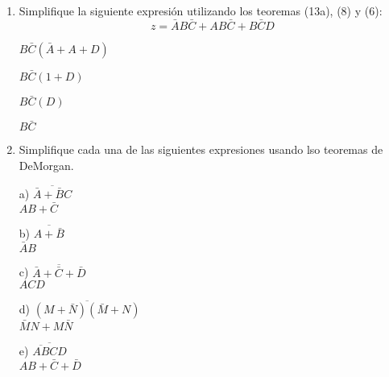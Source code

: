 \documentclass[a4paper, 12pt]{article}
\newcommand{\Aspace}{0.2cm}
\begin{document}
\begin{enumerate}
        
        \item Simplifique la siguiente expresión utilizando los teoremas (13a), (8) y (6):
        \[ z = \bar{A}B\bar{C} + AB\bar{C} + B\bar{C}D \]
            \par
            { \color{azul} 
                        $B\bar{C}(\bar{A} + A + D)$
                \par    $B\bar{C}(1 + D)$
                \par    $B\bar{C}(D)$
                \par    $B\bar{C}$
            }



        \item Simplifique cada una de las siguientes expresiones usando lso teoremas de DeMorgan.
            \vspace{\Aspace} \par
            a) $\overline{\bar{A} + \bar{B}C}$
            \\ { \color{azul} $AB + \bar{C}$ }

            \vspace{\Aspace} \par
            b) $\overline{A + \bar{B}}$
            \\ { \color{azul} $\bar{A}B$ }

            \vspace{\Aspace} \par
            c) $\overline{\bar{A} + \bar{C} + \bar{D}}$
            \\ { \color{azul} $ACD$ }

            \vspace{\Aspace} \par
            d) $\overline{(M + \bar{N})(\bar{M} + N)}$
            \\ { \color{azul} $\bar{M}N + M\bar{N}$ }

            \vspace{\Aspace} \par
            e) $\overline{\overline{AB}CD}$
            \\ { \color{azul} $AB + \bar{C} + \bar{D}$ }



\end{enumerate}
\end{document}
